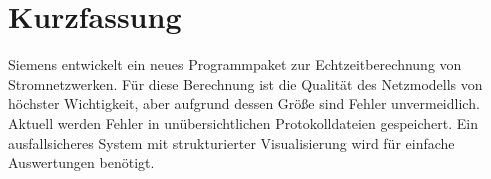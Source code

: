 \section{Kurzfassung}

Siemens entwickelt ein neues Programmpaket zur Echtzeitberechnung von Stromnetzwerken. Für diese Berechnung ist die Qualität des Netzmodells von höchster Wichtigkeit, aber aufgrund dessen Größe sind Fehler unvermeidlich. Aktuell werden Fehler in unübersichtlichen Protokolldateien gespeichert. Ein ausfallsicheres System mit strukturierter Visualisierung wird für einfache Auswertungen benötigt.
